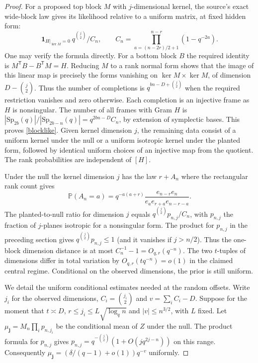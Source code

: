 \documentclass[11pt]{article}
\newcommand{\PP}{\mathbb P}
\begin{document}
\begin{proof}
For a proposed top block $M$ with $j$-dimensional kernel, the source's exact wide-block law \cite{repo} gives its likelihood relative to a uniform matrix, at fixed hidden form:
\begin{equation}\label{blocklike}
 \mathbf1_{H|_{\ker M}=0}\ q^{\binom j2}/C_n,\qquad
 C_n=\prod_{a=(n-2r)/2+1}^{n-r}(1-q^{-2a}).
\end{equation}
One may verify the formula directly. For a bottom block $B$ the required identity is $M^{\mathsf T}B-B^{\mathsf T}M=H$. Reducing $M$ to a rank normal form shows that the image of this linear map is precisely the forms vanishing on $\ker M\times\ker M$, of dimension $D-\binom j2$. Thus the number of completions is $q^{bn-D+\binom j2}$ when the required restriction vanishes and zero otherwise. Each completion is an injective frame as $H$ is nonsingular. The number of all frames with Gram $H$ is $|\mathrm{Sp}_{2b}(q)|/|\mathrm{Sp}_{2b-n}(q)|=q^{2bn-D}C_n$, by extension of symplectic bases. This proves \eqref{blocklike}. Given kernel dimension $j$, the remaining data consist of a uniform kernel under the null or a uniform isotropic kernel under the planted form, followed by identical uniform choices of an injective map from the quotient. The rank probabilities are independent of $[H]$.

Under the null the kernel dimension $j$ has the law $r+A_n$ where the rectangular rank count gives
\[
 \PP(A_n=a)=
 q^{-a(a+r)}\frac{e_{n-r}e_n}{e_a e_{r+a} e_{n-r-a}}.
\]
The planted-to-null ratio for dimension $j$ equals $q^{\binom j2}p_{n,j}/C_n$, with $p_{n,j}$ the fraction of $j$-planes isotropic for a nonsingular form. The product for $p_{n,j}$ in the preceding section gives $q^{\binom j2}p_{n,j}\le1$ (and it vanishes if $j>n/2$). Thus the one-block dimension distance is at most $C_n^{-1}-1=O_{q,r}(q^{-n})$. The two $t$-tuples of dimensions differ in total variation by $O_{q,r}(tq^{-n})=o(1)$ in the claimed central regime. Conditional on the observed dimensions, the prior is still uniform.

We detail the uniform conditional estimates needed at the random offsets. Write $j_i$ for the observed dimensions, $C_i=\binom{j_i}2$ and $v=\sum_i C_i-D$. Suppose for the moment that $t\asymp D$, $r\le j_i\le L\sqrt{\log_q n}$ and $|v|\le n^{3/2}$, with $L$ fixed. Let $\mu_{\boldsymbol j}=M_n\prod_i p_{n,j_i}$ be the conditional mean of $Z$ under the null. The product formula for $p_{n,j}$ gives $p_{n,j}=q^{-\binom j2}(1+O(jq^{2j-n}))$ on this range. Consequently $\mu_{\boldsymbol j}=(\delta/(q-1)+o(1))q^{-v}$ uniformly.


\end{proof}
\end{document}

